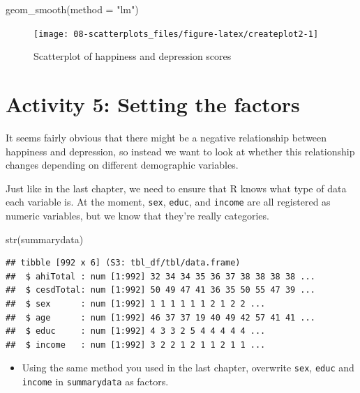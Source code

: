 \documentclass[
  oneside]{book}
\newenvironment{Shaded}{\begin{snugshade}}{\end{snugshade}}
\newcommand{\AttributeTok}[1]{\textcolor[rgb]{0.77,0.63,0.00}{#1}}
\newcommand{\FunctionTok}[1]{\textcolor[rgb]{0.00,0.00,0.00}{#1}}
\newcommand{\NormalTok}[1]{#1}
\newcommand{\StringTok}[1]{\textcolor[rgb]{0.31,0.60,0.02}{#1}}
\providecommand{\tightlist}{%
  \setlength{\itemsep}{0pt}\setlength{\parskip}{0pt}}
\begin{document}
\begin{Shaded}
\begin{Highlighting}[]
\FunctionTok{geom\_smooth}\NormalTok{(}\AttributeTok{method =} \StringTok{"lm"}\NormalTok{)}
\end{Highlighting}
\end{Shaded}

\begin{figure}

{\centering \texttt{[image: 08-scatterplots\_files/figure-latex/createplot2-1]} 

}

\caption{Scatterplot of happiness and depression scores}\label{fig:createplot2}
\end{figure}

\hypertarget{activity-5-setting-the-factors}{%
\section{Activity 5: Setting the factors}\label{activity-5-setting-the-factors}}

It seems fairly obvious that there might be a negative relationship between happiness and depression, so instead we want to look at whether this relationship changes depending on different demographic variables.

Just like in the last chapter, we need to ensure that R knows what type of data each variable is. At the moment, \texttt{sex}, \texttt{educ}, and \texttt{income} are all registered as numeric variables, but we know that they're really categories.

\begin{Shaded}
\begin{Highlighting}[]
\FunctionTok{str}\NormalTok{(summarydata)}
\end{Highlighting}
\end{Shaded}

\begin{verbatim}
## tibble [992 x 6] (S3: tbl_df/tbl/data.frame)
##  $ ahiTotal : num [1:992] 32 34 34 35 36 37 38 38 38 38 ...
##  $ cesdTotal: num [1:992] 50 49 47 41 36 35 50 55 47 39 ...
##  $ sex      : num [1:992] 1 1 1 1 1 1 2 1 2 2 ...
##  $ age      : num [1:992] 46 37 37 19 40 49 42 57 41 41 ...
##  $ educ     : num [1:992] 4 3 3 2 5 4 4 4 4 4 ...
##  $ income   : num [1:992] 3 2 2 1 2 1 1 2 1 1 ...
\end{verbatim}

\begin{itemize}
\tightlist
\item
  Using the same method you used in the last chapter, overwrite \texttt{sex}, \texttt{educ} and \texttt{income} in \texttt{summarydata} as factors.
\end{itemize}
\end{document}
